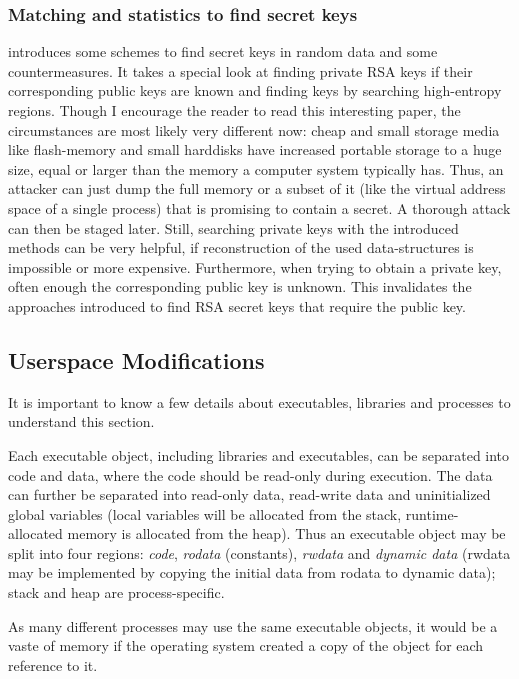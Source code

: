 \subsubsection{Matching and statistics to find secret keys}

\cite{hide_n_seek:1998} introduces some schemes to find secret keys in random
data and some countermeasures. It takes a special look at finding private RSA
keys if their corresponding public keys are known and finding keys by searching
high-entropy regions. Though I encourage the reader to read this interesting
paper, the circumstances are most likely very different now: cheap and small
storage media like flash-memory and small harddisks have increased portable
storage to a huge size, equal or larger than the memory a computer system
typically has. Thus, an attacker can just dump the full memory or a subset of it
(like the virtual address space of a single process) that is promising to
contain a secret. A thorough attack can then be staged later.  Still, searching
private keys with the introduced methods can be very helpful, if reconstruction
of the used data-structures is impossible or more expensive. Furthermore, when
trying to obtain a private key, often enough the corresponding public key is
unknown. This invalidates the approaches introduced to find RSA secret keys that
require the public key.




\subsection{Userspace Modifications}

It is important to know a few details about executables, libraries and processes
to understand this section.

Each executable object, including libraries and executables, can be separated
into code and data, where the code should be read-only during execution. The
data can further be separated into read-only data, read-write data and
uninitialized global variables (local variables will be allocated from the
stack, runtime-allocated memory is allocated from the heap).  Thus an executable
object may be split into four regions: \emph{code}, \emph{rodata} (constants),
\emph{rwdata} and \emph{dynamic data} (rwdata may be implemented by copying the
initial data from rodata to dynamic data); stack and heap are process-specific.

As many different processes may use the same executable objects, it would be a
vaste of memory if the operating system created a copy of the object for each
reference to it.

